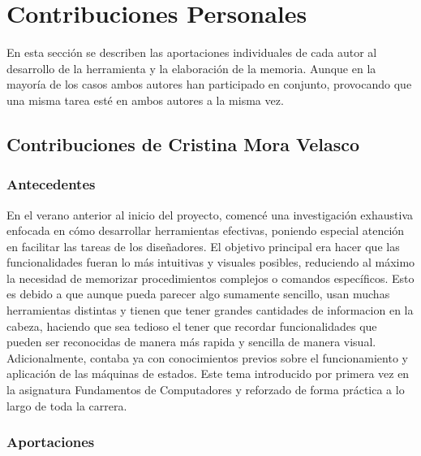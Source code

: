 \chapter{Contribuciones Personales}
\label{cap:contribucionesPersonales}

En esta sección se describen las aportaciones individuales de cada autor al desarrollo de la herramienta y la elaboración de la memoria. Aunque en la mayoría de los casos ambos autores han participado en conjunto, provocando que una misma tarea esté en ambos autores a la misma vez.

\section{Contribuciones de Cristina Mora Velasco}
\subsection{Antecedentes}
En el verano anterior al inicio del proyecto, comencé una investigación exhaustiva enfocada en cómo desarrollar herramientas efectivas, poniendo especial atención en facilitar las tareas de los diseñadores. El objetivo principal era hacer que las funcionalidades fueran lo más intuitivas y visuales posibles, reduciendo al máximo la necesidad de memorizar procedimientos complejos o comandos específicos. Esto es debido a que aunque pueda parecer algo sumamente sencillo, usan muchas herramientas distintas y tienen que tener grandes cantidades de informacion en la cabeza, haciendo que sea tedioso el tener que recordar funcionalidades que pueden ser reconocidas de manera más rapida y sencilla de manera visual. 
Adicionalmente, contaba ya con conocimientos previos sobre el funcionamiento y aplicación de las máquinas de estados. Este tema introducido por primera vez en la asignatura Fundamentos de Computadores y reforzado de forma práctica a lo largo de toda la carrera. 
\subsection{Aportaciones}
